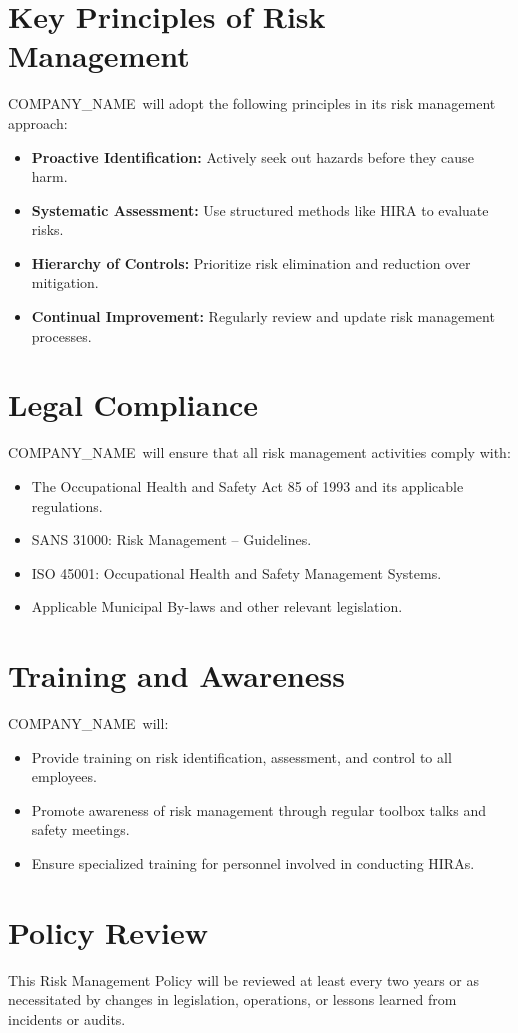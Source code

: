 \documentclass[11pt]{article}
\newcommand{\clientName}{{{COMPANY_NAME}}}
\begin{document}
\section{Key Principles of Risk Management}
\clientName\ will adopt the following principles in its risk management approach:
\begin{itemize}
    \item \textbf{Proactive Identification:} Actively seek out hazards before they cause harm.
    \item \textbf{Systematic Assessment:} Use structured methods like HIRA to evaluate risks.
    \item \textbf{Hierarchy of Controls:} Prioritize risk elimination and reduction over mitigation.
    \item \textbf{Continual Improvement:} Regularly review and update risk management processes.
\end{itemize}

\section{Legal Compliance}
\clientName\ will ensure that all risk management activities comply with:
\begin{itemize}
    \item The Occupational Health and Safety Act 85 of 1993 and its applicable regulations.
    \item SANS 31000: Risk Management – Guidelines.
    \item ISO 45001: Occupational Health and Safety Management Systems.
    \item Applicable Municipal By-laws and other relevant legislation.
\end{itemize}

\section{Training and Awareness}
\clientName\ will:
\begin{itemize}
    \item Provide training on risk identification, assessment, and control to all employees.
    \item Promote awareness of risk management through regular toolbox talks and safety meetings.
    \item Ensure specialized training for personnel involved in conducting HIRAs.
\end{itemize}

\section{Policy Review}
This Risk Management Policy will be reviewed at least every two years or as necessitated by changes in legislation, operations, or lessons learned from incidents or audits.
\end{document}
